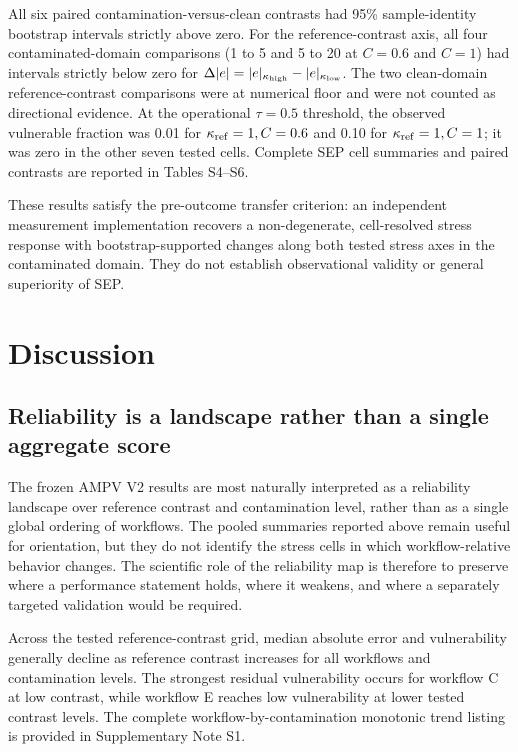 All six paired contamination-versus-clean contrasts had 95\%
sample-identity bootstrap intervals strictly above zero. For the
reference-contrast axis, all four contaminated-domain comparisons
(1 to 5 and 5 to 20 at \(C=0.6\) and \(C=1\)) had intervals
strictly below zero for
\(\Delta|e|=|e|_{\kappa_{\rm high}}-|e|_{\kappa_{\rm low}}\).
The two clean-domain reference-contrast comparisons were at numerical
floor and were not counted as directional evidence. At the operational
\(\tau=0.5\) threshold, the observed vulnerable fraction was 0.01
for \(\kappa_{\rm ref}=1,C=0.6\) and 0.10 for
\(\kappa_{\rm ref}=1,C=1\); it was zero in the other seven tested
cells. Complete SEP cell summaries and paired contrasts are reported in Tables S4--S6.

These results satisfy the pre-outcome transfer criterion: an independent
measurement implementation recovers a non-degenerate, cell-resolved
stress response with bootstrap-supported changes along both tested
stress axes in the contaminated domain. They do not establish
observational validity or general superiority of SEP.

\section{Discussion}\label{discussion}

\subsection{Reliability is a landscape rather than a single aggregate
score}\label{reliability-is-a-landscape-rather-than-a-single-aggregate-score}

The frozen AMPV V2 results are most naturally interpreted as a
reliability landscape over reference contrast and contamination level,
rather than as a single global ordering of workflows. The pooled
summaries reported above remain useful for orientation, but they do not
identify the stress cells in which workflow-relative behavior changes.
The scientific role of the reliability map is therefore to preserve
where a performance statement holds, where it weakens, and where a
separately targeted validation would be required.

Across the tested reference-contrast grid, median absolute error and
vulnerability generally decline as reference contrast increases for all
workflows and contamination levels. The strongest residual vulnerability
occurs for workflow C at low contrast, while workflow E reaches low
vulnerability at lower tested contrast levels. The complete
workflow-by-contamination monotonic trend listing is provided in
Supplementary Note S1.

